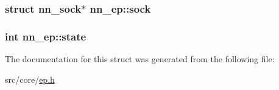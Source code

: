 \subsubsection[{sock}]{\setlength{\rightskip}{0pt plus 5cm}struct {\bf nn\+\_\+sock}$\ast$ nn\+\_\+ep\+::sock}\hypertarget{structnn__ep_a089f04f3d0b46462884350c430a417e9}{}\label{structnn__ep_a089f04f3d0b46462884350c430a417e9}
\subsubsection[{state}]{\setlength{\rightskip}{0pt plus 5cm}int nn\+\_\+ep\+::state}\hypertarget{structnn__ep_a84d29e1ab854c45678ba5cb07b525a33}{}\label{structnn__ep_a84d29e1ab854c45678ba5cb07b525a33}


The documentation for this struct was generated from the following file\+:\begin{DoxyCompactItemize}
\item 
src/core/\hyperlink{ep_8h}{ep.\+h}\end{DoxyCompactItemize}
